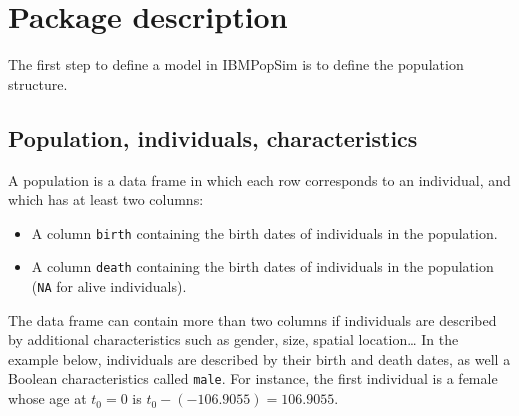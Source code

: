 \begin{Shaded}
\begin{Highlighting}[]
\SpecialCharTok{$}\OtherTok{\textless{}{-}} 

\NormalTok{events\_bounds[}\NormalTok{] }\OtherTok{\textless{}{-}}\SpecialCharTok{$}\SpecialCharTok{*} \SpecialCharTok{$}\SpecialCharTok{*}

\OtherTok{\textless{}{-}} 
                   \NormalTok{)}
\end{Highlighting}
\end{Shaded}

\hypertarget{package-description}{%
\section{Package description}\label{package-description}}

The first step to define a model in IBMPopSim is to define the population structure.

\hypertarget{population}{%
\subsection{Population, individuals, characteristics}\label{population}}

A population is a data frame in which each row corresponds to an individual, and which has at least two columns:

\begin{itemize}
\tightlist
\item
  A column \texttt{birth} containing the birth dates of individuals in the population.
\item
  A column \texttt{death} containing the birth dates of individuals in the population (\texttt{NA} for alive individuals).
\end{itemize}

The data frame can contain more than two columns if individuals are described by additional characteristics such as gender, size, spatial location\ldots{}
In the example below, individuals are described by their birth and death dates, as well a Boolean characteristics called \texttt{male}. For instance, the first individual is a female whose age at \(t_0=0\) is \(t_0 - (-106.9055) = 106.9055\).

